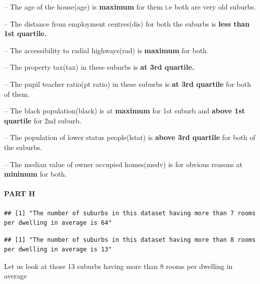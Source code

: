\documentclass[
]{article}
\begin{document}
-- The age of the house(age) is \textbf{maximum} for them i.e both are
very old suburbs.

-- The distance from employment centres(dis) for both the suburbs is
\textbf{less than 1st quartile.}

-- The accessibility to radial highways(rad) is \textbf{maximum} for
both.

-- The property tax(tax) in these suburbs is \textbf{at 3rd quartile.}

-- The pupil teacher ratio(pt ratio) in these suburbs is \textbf{at 3rd
quartile} for both of them.

-- The black population(black) is at \textbf{maximum} for 1st suburb and
\textbf{above 1st quartile} for 2nd suburb.

-- The population of lower status people(lstat) is \textbf{above 3rd
quartile} for both of the suburbs.

-- The median value of owner occupied homes(medv) is for obvious reasons
at \textbf{minimum} for both.

\pagebreak

\hypertarget{part-h}{%
\paragraph{PART H}\label{part-h}}

\begin{verbatim}
## [1] "The number of suburbs in this dataset having more than 7 rooms per dwelling in average is 64"
\end{verbatim}

\begin{verbatim}
## [1] "The number of suburbs in this dataset having more than 8 rooms per dwelling in average is 13"
\end{verbatim}

Let us look at those 13 suburbs having more than 8 rooms per dwelling in
average
\end{document}
